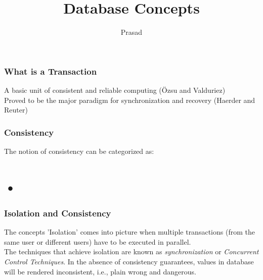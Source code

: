 \documentclass[12]{beamer}
\title{Database Concepts}
\author{Prasad}
\date
\begin{document}
\maketitle

\begin{frame}
\frametitle{What is a Transaction}

A basic unit of consistent and reliable computing (\"Ozsu and Valduriez) \\
\vspace{5mm}
Proved to be the major paradigm for synchronization and recovery (Haerder and Reuter)

\end{frame}

\begin{frame}
\frametitle{Consistency}
The notion of consistency can be categorized as:
\section{•}
\end{frame}

\begin{frame}
\frametitle{Isolation and Consistency}

The concepts 'Isolation' comes into picture when multiple transactions (from the same user or different users) have to be executed in parallel. \\
\vspace{5mm}
The techniques that achieve isolation are known as \textit{synchronization} or \textit{Concurrent Control Techniques}. In the absence of consistency guarantees, values in database will be rendered inconsistent, i.e., plain wrong and dangerous.
\end{frame}

\begin{frame}
\
\end{frame}
\end{document}
